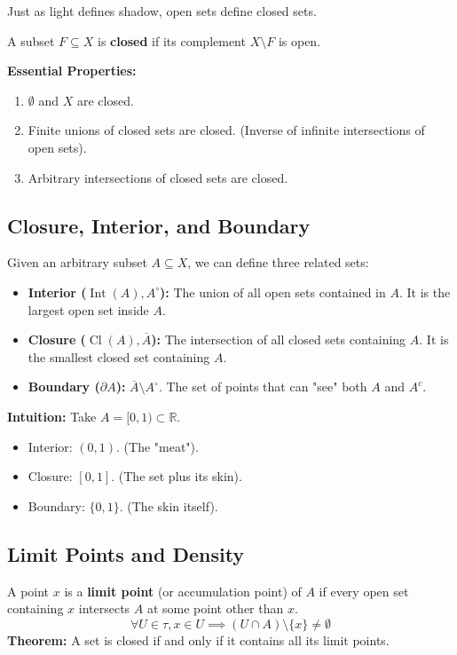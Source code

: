 \documentclass[oneside]{book}
\begin{document}
Just as light defines shadow, open sets define closed sets.

\begin{definition}
A subset $F \subseteq X$ is \textbf{closed} if its complement $X \setminus F$ is open.
\end{definition}

\textbf{Essential Properties:}
\begin{enumerate}
    \item $\emptyset$ and $X$ are closed.
    \item Finite unions of closed sets are closed. (Inverse of infinite intersections of open sets).
    \item Arbitrary intersections of closed sets are closed.
\end{enumerate}

\newpage

\subsection{Closure, Interior, and Boundary}
Given an arbitrary subset $A \subseteq X$, we can define three related sets:

\begin{definition}
\begin{itemize}
    \item \textbf{Interior ($\operatorname{Int}(A), A^\circ$):} The union of all open sets contained in $A$. It is the largest open set inside $A$.
    \item \textbf{Closure ($\operatorname{Cl}(A), \overline{A}$):} The intersection of all closed sets containing $A$. It is the smallest closed set containing $A$.
    \item \textbf{Boundary ($\partial A$):} $\overline{A} \setminus A^\circ$. The set of points that can "see" both $A$ and $A^c$.
\end{itemize}
\end{definition}

\textbf{Intuition:}
Take $A = [0, 1) \subset \mathbb{R}$.
\begin{itemize}
    \item Interior: $(0, 1)$. (The "meat").
    \item Closure: $[0, 1]$. (The set plus its skin).
    \item Boundary: $\{0, 1\}$. (The skin itself).
\end{itemize}

\subsection{Limit Points and Density}
A point $x$ is a \textbf{limit point} (or accumulation point) of $A$ if every open set containing $x$ intersects $A$ at some point other than $x$.
\[ \forall U \in \tau, x \in U \implies (U \cap A) \setminus \{x\} \neq \emptyset \]
\textbf{Theorem:} A set is closed if and only if it contains all its limit points.
\end{document}
